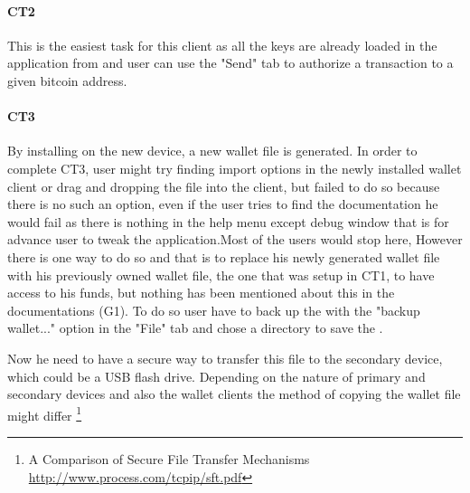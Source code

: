\paragraph{CT2} This is the easiest task for this client as all the keys are already loaded in the application from \walletfile and user can use the "Send" tab to authorize a transaction to a given bitcoin address.

\paragraph{CT3} By installing \bitcoinclient on the new device, a new wallet file is generated. In order to complete CT3, user might try finding import options in the newly installed wallet client or drag and dropping the file into the client, but failed to do so because there is no such an option, even if the user tries to find the documentation he would fail as there is nothing in the help menu except debug window that is for advance user to tweak the application.Most of the users would stop here, However there is one way to do so and that is to replace his newly generated wallet file with his previously owned wallet file, the one that was setup in CT1, to have access to his funds, but nothing has been mentioned about this in the documentations (G1). To do so user have to back up the \walletfile with the "backup wallet..." option in the "File" tab and chose a directory to save the \walletfile. \

Now he need to have a secure way to transfer this file to the secondary device, which could be a USB flash drive. Depending on the nature of primary and secondary devices and also the wallet clients the method of copying the wallet file might differ \footnote{A Comparison of Secure File Transfer Mechanisms \url{http://www.process.com/tcpip/sft.pdf}}

